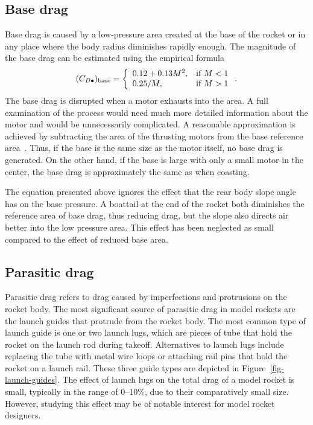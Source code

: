 




\subsection{Base drag}
\label{sec-base-drag}

Base drag is caused by a low-pressure area created at the base of the
rocket or in any place where the body radius diminishes rapidly
enough.  The magnitude of the base drag can be estimated using the
empirical formula~\cite[p.~23]{fleeman}
%
\begin{equation}
(C_{D\bullet})_{\rm base} = 
  \left\{ 
\begin{array}{ll}
  0.12+0.13M^2, & \mbox{if $M<1$} \\
  0.25/M,         & \mbox{if $M>1$}
\end{array}
  \right. .
\label{eq-base-drag}
\end{equation}
%
The base drag is disrupted when a motor exhausts into the area.  A
full examination of the process would need much more detailed
information about the motor and would be unnecessarily complicated.  A
reasonable approximation is achieved by subtracting the area of the
thrusting motors from the base reference area~\cite[p.~23]{fleeman}.
Thus, if the base is the same size as the motor itself, no base drag
is generated.  On the other hand, if the base is large with only a
small motor in the center, the base drag is approximately the same as
when coasting.

The equation presented above ignores the effect that the rear body
slope angle has on the base pressure.  A boattail at the end of the
rocket both diminishes the reference area of base drag, thus reducing
drag, but the slope also directs air better into the low pressure
area. This effect has been neglected as small compared to the effect
of reduced base area.









\subsection{Parasitic drag}

Parasitic drag refers to drag caused by imperfections and protrusions
on the rocket body.  The most significant source of parasitic drag in
model rockets are the launch guides that protrude from the rocket
body.  The most common type of launch guide is one or two launch lugs,
which are pieces of tube that hold the rocket on the launch rod during
takeoff.  Alternatives to launch lugs include replacing the tube with
metal wire loops or attaching rail pins that hold the rocket on a
launch rail.  These three guide types are depicted in
Figure~\ref{fig-launch-guides}.  The effect of launch lugs on the
total drag of a model rocket is small, typically in the range of
0--10\%, due to their comparatively small size.  However, studying
this effect may be of notable interest for model rocket designers.


